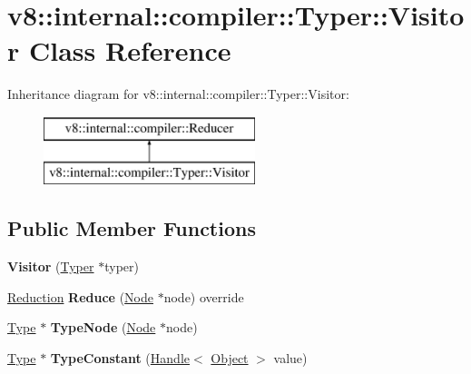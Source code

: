 \hypertarget{classv8_1_1internal_1_1compiler_1_1_typer_1_1_visitor}{}\section{v8\+:\+:internal\+:\+:compiler\+:\+:Typer\+:\+:Visitor Class Reference}
\label{classv8_1_1internal_1_1compiler_1_1_typer_1_1_visitor}
Inheritance diagram for v8\+:\+:internal\+:\+:compiler\+:\+:Typer\+:\+:Visitor\+:\begin{figure}[H]
\begin{center}
\leavevmode
\includegraphics[height=2.000000cm]{classv8_1_1internal_1_1compiler_1_1_typer_1_1_visitor}
\end{center}
\end{figure}
\subsection*{Public Member Functions}
\begin{DoxyCompactItemize}
\item 
{\bfseries Visitor} (\hyperlink{classv8_1_1internal_1_1compiler_1_1_typer}{Typer} $\ast$typer)\hypertarget{classv8_1_1internal_1_1compiler_1_1_typer_1_1_visitor_a167978cb4973eebd023e9e290a855ee1}{}\label{classv8_1_1internal_1_1compiler_1_1_typer_1_1_visitor_a167978cb4973eebd023e9e290a855ee1}

\item 
\hyperlink{classv8_1_1internal_1_1compiler_1_1_reduction}{Reduction} {\bfseries Reduce} (\hyperlink{classv8_1_1internal_1_1compiler_1_1_node}{Node} $\ast$node) override\hypertarget{classv8_1_1internal_1_1compiler_1_1_typer_1_1_visitor_ae79a117c7cedd45f4f4796f1abf45264}{}\label{classv8_1_1internal_1_1compiler_1_1_typer_1_1_visitor_ae79a117c7cedd45f4f4796f1abf45264}

\item 
\hyperlink{classv8_1_1internal_1_1_type}{Type} $\ast$ {\bfseries Type\+Node} (\hyperlink{classv8_1_1internal_1_1compiler_1_1_node}{Node} $\ast$node)\hypertarget{classv8_1_1internal_1_1compiler_1_1_typer_1_1_visitor_af8a0753ba9282e7e762a2544baa4e7f7}{}\label{classv8_1_1internal_1_1compiler_1_1_typer_1_1_visitor_af8a0753ba9282e7e762a2544baa4e7f7}

\item 
\hyperlink{classv8_1_1internal_1_1_type}{Type} $\ast$ {\bfseries Type\+Constant} (\hyperlink{classv8_1_1internal_1_1_handle}{Handle}$<$ \hyperlink{classv8_1_1internal_1_1_object}{Object} $>$ value)\hypertarget{classv8_1_1internal_1_1compiler_1_1_typer_1_1_visitor_a63a10a82c3b12e23330290788139d868}{}\label{classv8_1_1internal_1_1compiler_1_1_typer_1_1_visitor_a63a10a82c3b12e23330290788139d868}

\end{DoxyCompactItemize}
